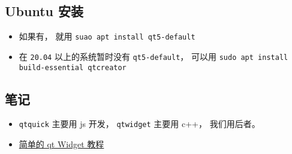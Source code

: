 
\begin{issues}
\issueDraft
\end{issues}

\subsection{Ubuntu 安装}
\begin{itemize}
\item 如果有， 就用 \verb|suao apt install qt5-default|
\item 在 \verb|20.04| 以上的系统暂时没有 \verb|qt5-default|， 可以用 \verb|sudo apt install build-essential qtcreator|
\end{itemize}

\subsection{笔记}
\begin{itemize}
\item \verb|qtquick| 主要用 js 开发，  \verb|qtwidget| 主要用 c++， 我们用后者。
\item \href{https://doc.qt.io/qt-5/qtwidgets-tutorials-notepad-example.html}{简单的 qt Widget 教程}
\end{itemize}

